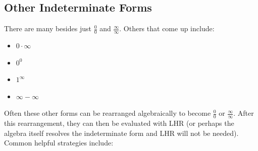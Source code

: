\subsection{Other Indeterminate Forms}
There are many  besides just $\frac{0}{0}$ and $\frac{\infty}{\infty}$.  Others that come up include: 
\begin{itemize}
\item $0\cdot \infty$
\item $0^0$
\item $1^\infty$
\item $\infty-\infty$
\end{itemize}
Often these other forms can be rearranged algebraically to become $\frac{0}{0}$ or $\frac{\infty}{\infty}$.  After this rearrangement, they can then be evaluated with LHR (or perhaps the algebra itself resolves the indeterminate form and LHR will not be needed).  Common helpful strategies include:

